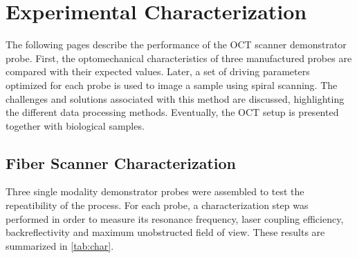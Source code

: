 %
%
\chapter{Experimental Characterization}
\label{Ch:Measurements}	

The following pages describe the performance of the OCT scanner demonstrator probe. First, the optomechanical characteristics of three manufactured probes are compared with their expected values. Later, a set of driving parameters optimized for each probe is used to image a sample using spiral scanning. The challenges and solutions associated with this method are discussed, highlighting the different data processing methods. Eventually, the OCT setup is presented together with biological samples.

\section{Fiber Scanner Characterization}

Three single modality demonstrator probes were assembled to test the repeatibility of the process.  For each probe, a characterization step was performed in order to measure its resonance frequency, laser coupling efficiency, backreflectivity and maximum unobstructed field of view. These results are summarized in \autoref{tab:char}.

